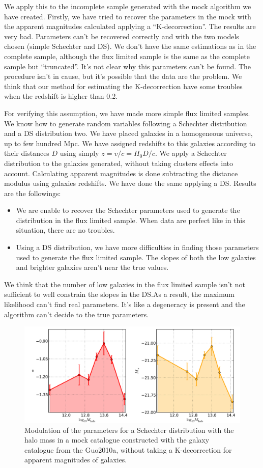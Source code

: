 We apply this to the incomplete sample generated with the mock algorithm we
have created. Firstly, we have tried to recover the parameters in the mock with
the apparent magnitudes calculated applying a ``K-decorrection''. The results
are very bad. Parameters can't be recovered correctly and with the two models
chosen (simple Schechter and DS). We don't have the same estimations as in the
complete sample, although the flux limited sample is the same as the complete
sample but ``truncated''. It's not clear why this parameters can't be found.
The procedure isn't in cause, but it's possible that the data are the problem.
We think that our method for estimating the K-decorrection have some troubles
when the redshift is higher than 0.2.

For verifying this assumption, we have made more simple flux limited samples.
We know how to generate random variables following a Schechter distribution and
a DS distribution two. We have placed galaxies in a homogeneous universe, up to
few hundred Mpc. We have assigned redshifts to this galaxies according to their
distances $D$ using simply $z=v/c={H_0}{D}/c$. We apply a Schechter
distribution to the galaxies generated, without taking clusters effects into
account. Calculating apparent magnitudes is done subtracting the distance
modulus using galaxies redshifts. We have done the same applying a DS.\@
Results are the followings:
%
\begin{itemize}
    \item We are enable to recover the Schechter parameters used to generate
        the distribution in the flux limited sample. When data are perfect like
        in this situation, there are no troubles.
    \item Using a DS distribution, we have more difficulties in finding those
        parameters used to generate the flux limited sample. The slopes of both
        the low galaxies and brighter galaxies aren't near the true values.
\end{itemize}
%
We think that the number of low galaxies in the flux limited sample isn't not
sufficient to well constrain the slopes in the DS.\@ As a result, the maximum
likelihood can't find real parameters. It's like a degeneracy is present and
the algorithm can't decide to the true parameters.
%
\begin{figure}[htb]
    \centering
    \includegraphics[width=0.8\linewidth]{figures/lf/evolSchechterMock}
    \caption{Modulation of the parameters for a Schechter distribution with the
    halo mass in a mock catalogue constructed with the galaxy catalogue from
the Guo2010a, without taking a K-decorrection for apparent magnitudes of
galaxies.}
\label{fig:parammock}
\end{figure}

